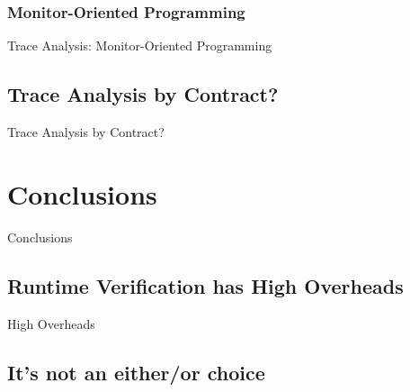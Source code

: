 \documentclass[12pt]{beamer}
\begin{document}
\subsubsection{Monitor-Oriented Programming}
\label{sec:runver-trace-mop}

\begin{frame}{Trace Analysis: Monitor-Oriented Programming}

\end{frame}


\subsection{Trace Analysis by Contract?}
\label{sec:runver-tbc}

\begin{frame}{Trace Analysis by Contract?}
\end{frame}


\section{Conclusions}
\label{sec:conc}

\begin{frame}{Conclusions}

\end{frame}

\subsection{Runtime Verification has High Overheads}
\label{sec:conc-over}

\begin{frame}{High Overheads}

\end{frame}

\subsection{It's not an either/or choice}
\label{sec:conc-dich}
\end{document}
